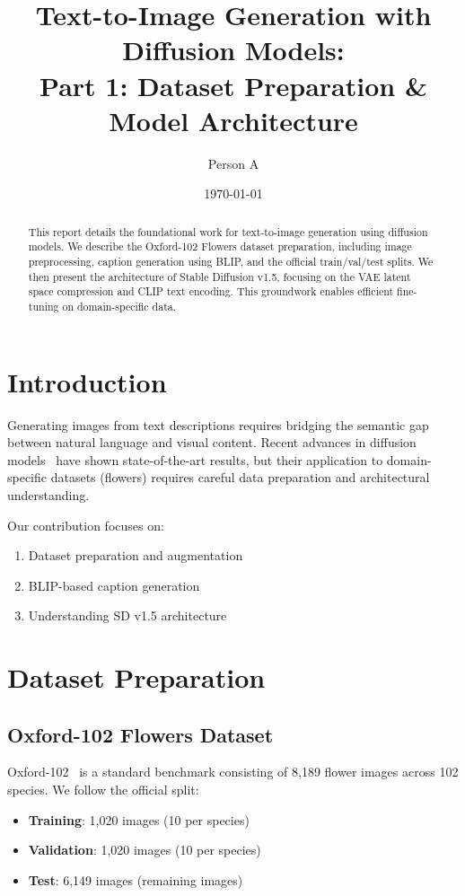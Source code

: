 \documentclass[11pt]{article}
\title{Text-to-Image Generation with Diffusion Models:\\
{\large Part 1: Dataset Preparation \& Model Architecture}}
\author{Person A}
\date{\today}
\begin{document}
\maketitle

\begin{abstract}
This report details the foundational work for text-to-image generation using diffusion models. We describe the Oxford-102 Flowers dataset preparation, including image preprocessing, caption generation using BLIP, and the official train/val/test splits. We then present the architecture of Stable Diffusion v1.5, focusing on the VAE latent space compression and CLIP text encoding. This groundwork enables efficient fine-tuning on domain-specific data.
\end{abstract}

\section{Introduction}

Generating images from text descriptions requires bridging the semantic gap between natural language and visual content. Recent advances in diffusion models~\cite{ho2020denoising,rombach2021high} have shown state-of-the-art results, but their application to domain-specific datasets (flowers) requires careful data preparation and architectural understanding.

Our contribution focuses on:
\begin{enumerate}
    \item Dataset preparation and augmentation
    \item BLIP-based caption generation
    \item Understanding SD v1.5 architecture
\end{enumerate}

\section{Dataset Preparation}

\subsection{Oxford-102 Flowers Dataset}

Oxford-102~\cite{nilsback2008automated} is a standard benchmark consisting of 8,189 flower images across 102 species. We follow the official split:
\begin{itemize}
    \item \textbf{Training}: 1,020 images (10 per species)
    \item \textbf{Validation}: 1,020 images (10 per species)
    \item \textbf{Test}: 6,149 images (remaining images)
\end{itemize}
\end{document}
